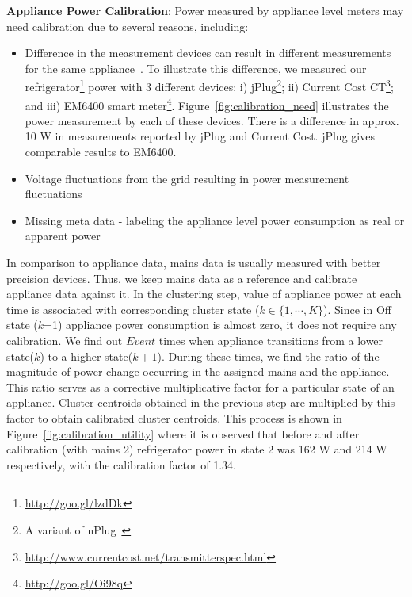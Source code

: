 \documentclass[conference]{IEEEtran}
\newcommand{\redcolor}[1]{\textcolor{red}{#1}}
\newcommand{\figref}[1]{Figure~\ref{#1}}
\newcommand{\denselistbib}{
  \itemsep -.6pt\topsep-4pt\partopsep-4pt
}
\begin{document}
\noindent\textbf{Appliance Power Calibration}: 
Power measured by appliance level meters may need calibration due to several reasons, including:\vspace{-2.5mm}
\begin{itemize}\denselistbib
\item Difference in the measurement devices can result in different measurements for the same appliance~\cite{berges2008}. To illustrate this difference, we measured our refrigerator\footnote{
\url{http://goo.gl/lzdDk}} power with 3 different devices: i) jPlug\footnote{A variant of nPlug~\cite{nplug}}; ii) Current Cost CT\footnote{\url{http://www.currentcost.net/transmitterspec.html}}; and iii) EM6400 smart meter\footnote{\url{http://goo.gl/Oi98q}}. 
\figref{fig:calibration_need} illustrates the power measurement by each of these devices. There is a difference in approx. 10 W in measurements reported by jPlug and Current Cost. jPlug gives comparable results to EM6400.
\item Voltage fluctuations from the grid resulting in power measurement fluctuations~\cite{hart}
\item Missing meta data - labeling the appliance level power consumption as real or apparent power 
\vspace{-1mm} \end{itemize}

\noindent In comparison to appliance data, mains data is usually measured with better precision devices. Thus, we keep mains data as a reference and calibrate appliance data against it. In the clustering step, value of appliance power at each time is associated with corresponding cluster state ($k \in \{1,\cdots,K\}$). Since in Off state ($k$=1) appliance power consumption is almost zero, it does not require any calibration. We find out $Event$ times when appliance transitions from a lower state($k$) to a higher state($k+1$). During these times, we find the ratio of the magnitude of power change occurring in the assigned mains and the appliance. This ratio serves as a corrective multiplicative factor for a particular  state of an appliance. Cluster centroids obtained in the previous step are multiplied by this factor to obtain calibrated cluster centroids. This process is shown in \figref{fig:calibration_utility} where it is observed that before and after calibration (with mains 2) refrigerator power in state 2 was 162 W and 214 W respectively, with the calibration factor of 1.34.
\end{document}
